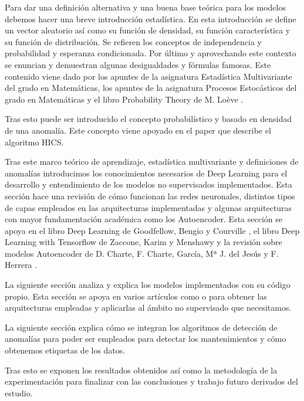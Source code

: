 Para dar una definición alternativa y una buena base teórica para los modelos debemos hacer una breve introducción estadística. En esta introducción se define un vector aleatorio así como su función de densidad, su función característica y su función de distribución. Se refieren los conceptos de independencia y probabilidad y esperanza condicionada. Por último y aprovechando este contexto se enuncian y demuestran algunas desigualdades y fórmulas famosas. Este contenido viene dado por los apuntes de la asignatura Estadística Multivariante del grado en Matemáticas, los apuntes de la asignatura Procesos Estocásticos del grado en Matemáticas y el libro Probability Theory de M. Loève \cite{m_loeve_probability_1977}.

Tras esto puede ser introducido el concepto probabilístico y basado en densidad de una anomalía. Este concepto viene apoyado en el paper \cite{fabian_keller_hics_2012} que describe el algoritmo HICS.

Tras este marco teórico de aprendizaje, estadística multivariante y definiciones de anomalías introducimos los conocimientos necesarios de Deep Learning para el desarrollo y entendimiento de los modelos no supervisados implementados. Esta sección hace una revisión de cómo funcionan las redes neuronales, distintos tipos de capas empleados en las arquitecturas implementadas y algunas arquitecturas con mayor fundamentación académica como los Autoencoder. Esta sección se apoya en el libro Deep Learning de Goodfellow, Bengio y Courville \cite{goodfellow_deep_2016}, el libro Deep Learning with Tensorflow de Zaccone, Karim y Menshawy \cite{giancarlo_deep_2017} y la revisión sobre modelos Autoencoder de D. Charte, F. Charte, García, Mª J. del Jesús y F. Herrera \cite{david_practical_2018}.

La siguiente sección analiza y explica los modelos implementados con su código propio. Esta sección se apoya en varios artículos como \cite{lih_oh_automated_2018} o \cite{david_practical_2018} para obtener las arquitecturas empleadas y aplicarlas al ámbito no supervisado que necesitamos.

La siguiente sección explica cómo se integran los algoritmos de detección de anomalías para poder ser empleados para detectar los mantenimientos y cómo obtenemos etiquetas de los datos.

Tras esto se exponen los resultados obtenidos así como la metodología de la experimentación para finalizar con las conclusiones y trabajo futuro derivados del estudio.

